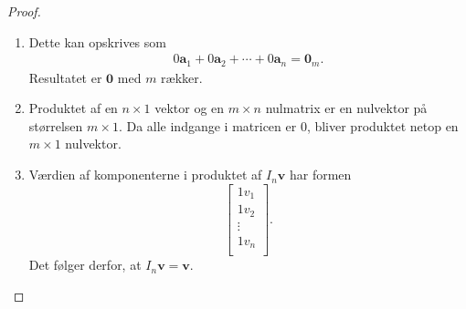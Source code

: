 \begin{proof}
\begin{enumerate}[label=(\alph*)]
\item Dette kan opskrives som
\begin{align*}
0\textbf{a}_1+0\textbf{a}_2+\cdots+0\textbf{a}_n = \textbf{0}_m.
\end{align*}
Resultatet er $\textbf{0}$ med $m$ rækker.
%
\item Produktet af en $n \times 1$ vektor og en $m \times n$ nulmatrix er en nulvektor på størrelsen $m \times 1$. Da alle indgange i matricen er $0$, bliver produktet netop en $m \times 1$ nulvektor. 
%
\item Værdien af komponenterne i produktet af $I_n\mathbf{v}$ har formen
$$
\begin{bmatrix}
1v_1 \\
1v_2 \\
\vdots \\
1v_n  \\
\end{bmatrix}.
$$
Det følger derfor, at $I_n\mathbf{v}=\textbf{v}$.
%
\end{enumerate}
\end{proof}